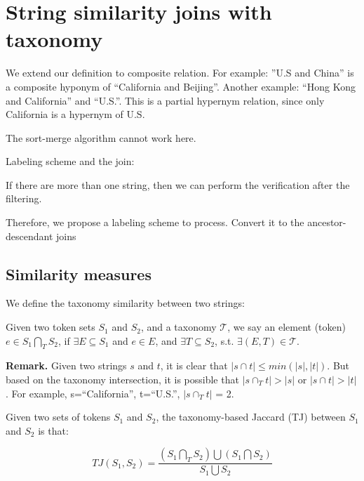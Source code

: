 
\section{String similarity joins with taxonomy}


We extend our definition to composite relation. For example: ''U.S and China'' is a composite hyponym of ``California and Beijing''. Another example: ``Hong Kong and California'' and ``U.S.''. This is a partial hypernym relation, since only California is a hypernym of U.S.

The sort-merge algorithm cannot work here.

Labeling scheme and the join:

If there are more than one string, then we can perform the verification after the filtering.


 Therefore, we propose a labeling scheme to process. Convert it to the ancestor-descendant joins



\subsection{Similarity measures}



We define the taxonomy similarity between two strings:

\begin{definition}
Given two token sets $S_1$ and $S_2$, and a taxonomy $\mathcal{T}$, we say an element (token) $e \in S_1 \bigcap_T S_2$, if $ \exists E \subseteq S_1$ and $e \in E$, and $\exists T \subseteq S_2$, s.t. $\exists (E,T) \in \mathcal{T}$.\end{definition}


\noindent \textbf{Remark.}  Given two strings $s$ and $t$, it is clear that $|s \cap t| \leq min (|s|,|t|)$. But based on the taxonomy intersection, it is possible that $|s \cap_T t| > |s| $ or $|s \cap t| > |t| $. For example, s=``California'', t=``U.S.'', $|s \cap_T t|$ = 2.

\begin{definition}   Given two sets of tokens $S_1$ and $S_2$,  the taxonomy-based Jaccard (TJ) between $S_1$ and $S_2$ is that:

\begin{equation}
TJ(S_1,S_2)=  \frac{(S_1 \bigcap_T S_2) \bigcup (S_1 \bigcap S_2) }{S_1 \bigcup S_2}
\end{equation} \end{definition}

